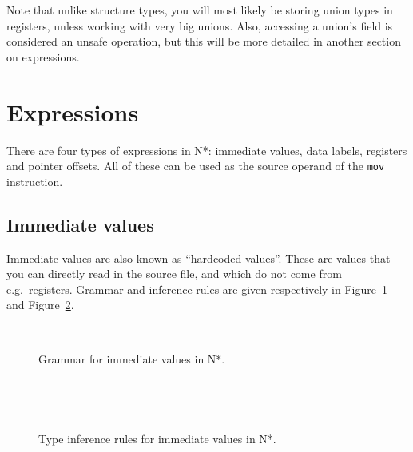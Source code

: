 Note that unlike structure types, you will most likely be storing union types in registers, unless working with very big unions.
Also, accessing a union's field is considered an unsafe operation, but this will be more detailed in another section on expressions.

\section{Expressions}\label{sec:nstar-common-expressions}

There are four types of expressions in N*: immediate values, data labels, registers and pointer offsets.
All of these can be used as the source operand of the \texttt{mov} instruction.

\subsection{Immediate values}\label{subsec:nstar-common-expressions-immediate}

Immediate values are also known as ``hardcoded values''.
These are values that you can directly read in the source file, and which do not come from e.g.\ registers.
Grammar and inference rules are given respectively in Figure~\ref{fig:nstar-common-expressions-immediate-grammar} and Figure~\ref{fig:nstar-common-expressions-immediate-typerules}.

\begin{figure}[H]
  \centering
  \\
  \caption{Grammar for immediate values in N*.}
  \label{fig:nstar-common-expressions-immediate-grammar}
\end{figure}

\begin{figure}[H]
  \centering

  \begin{prooftree}
  \end{prooftree}
  \\\vspace{\baselineskip}
  \begin{prooftree}
  \end{prooftree}
  \\\vspace{\baselineskip}
  \begin{prooftree}
  \end{prooftree}

  \caption{Type inference rules for immediate values in N*.}
  \label{fig:nstar-common-expressions-immediate-typerules}
\end{figure}

